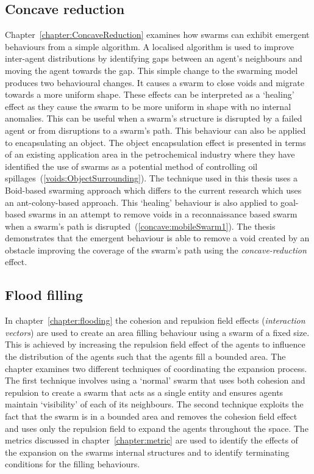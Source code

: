 \subsection{Concave reduction}
Chapter~\ref{chapter:ConcaveReduction} examines how swarms can exhibit emergent behaviours from a simple algorithm. A localised algorithm is used to improve inter-agent distributions by identifying gaps between an agent's neighbours and moving the agent towards the gap. This simple change to the swarming model produces two behavioural changes. It causes a swarm to close voids and migrate towards a more uniform shape. These effects can be interpreted as a `healing' effect as they cause the swarm to be more uniform in shape with no internal anomalies. This can be useful when a swarm's structure is disrupted by a failed agent or from disruptions to a swarm's path. This behaviour can also be applied to encapsulating an object. The object encapsulation effect is presented in terms of an existing application area in the petrochemical industry where they have identified the use of swarms as a potential method of controlling oil spillages~(\autoref{voids:ObjectSurrounding}). The technique used in this thesis uses a Boid-based swarming approach which differs to the current research which uses an ant-colony-based approach. This `healing' behaviour is also applied to goal-based swarms in an attempt to remove voids in a reconnaissance based swarm when a swarm's path is disrupted~(\autoref{concave:mobileSwarm1}). The thesis demonstrates that the emergent behaviour is able to remove a void created by an obstacle improving the coverage of the swarm's path using the \textit{concave-reduction} effect.

\subsection{Flood filling}
In chapter~\ref{chapter:flooding} the cohesion and repulsion field effects (\textit{interaction vectors}) are used to create an area filling behaviour using a swarm of a fixed size. This is achieved by increasing the repulsion field effect of the agents to influence the distribution of the agents such that the agents fill a bounded area. The chapter examines two different techniques of coordinating the expansion process. The first technique involves using a `normal' swarm that uses both cohesion and repulsion to create a swarm that acts as a single entity and ensures agents maintain `visibility' of each of its neighbours. The second technique exploits the fact that the swarm is in a bounded area and removes the cohesion field effect and uses only the repulsion field to expand the agents throughout the space. The metrics discussed in chapter~\ref{chapter:metric} are used to identify the effects of the expansion on the swarms internal structures and to identify terminating conditions for the filling behaviours.

